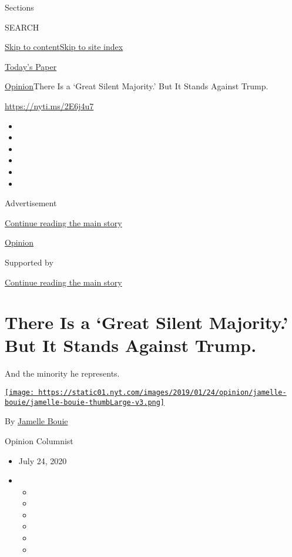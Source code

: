 Sections

SEARCH

\protect\hyperlink{site-content}{Skip to
content}\protect\hyperlink{site-index}{Skip to site index}

\href{https://myaccount.nytimes.com/auth/login?response_type=cookie\&client_id=vi}{}

\href{https://www.nytimes.com/section/todayspaper}{Today's Paper}

\href{/section/opinion}{Opinion}\textbar{}There Is a `Great Silent
Majority.' But It Stands Against Trump.

\href{https://nyti.ms/2E6j4u7}{https://nyti.ms/2E6j4u7}

\begin{itemize}
\item
\item
\item
\item
\item
\item
\end{itemize}

Advertisement

\protect\hyperlink{after-top}{Continue reading the main story}

\href{/section/opinion}{Opinion}

Supported by

\protect\hyperlink{after-sponsor}{Continue reading the main story}

\hypertarget{there-is-a-great-silent-majority-but-it-stands-against-trump}{%
\section{There Is a `Great Silent Majority.' But It Stands Against
Trump.}\label{there-is-a-great-silent-majority-but-it-stands-against-trump}}

And the minority he represents.

\href{https://www.nytimes.com/column/jamelle-bouie}{\texttt{[image: https://static01.nyt.com/images/2019/01/24/opinion/jamelle-bouie/jamelle-bouie-thumbLarge-v3.png]}}

By \href{https://www.nytimes.com/column/jamelle-bouie}{Jamelle Bouie}

Opinion Columnist

\begin{itemize}
\item
  July 24, 2020
\item
  \begin{itemize}
  \item
  \item
  \item
  \item
  \item
  \item
  \end{itemize}
\end{itemize}

